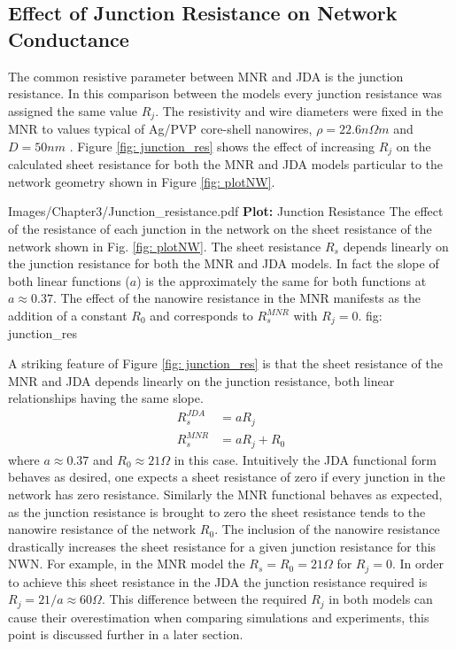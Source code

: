 \subsection{Effect of Junction Resistance on Network Conductance}
The common resistive parameter between MNR and JDA is the junction resistance. In this comparison between the models every junction resistance was assigned the same value $R_j$. The resistivity and wire diameters were fixed in the MNR to values typical of Ag/PVP core-shell nanowires, $\rho = 22.6 n \Omega m$ and $D = 50 nm$ \cite{rocha2015}. Figure \ref{fig: junction_res} shows the effect of increasing $R_j$ on the calculated sheet resistance for both the MNR and JDA models particular to the network geometry shown in Figure \ref{fig: plotNW}. 

{Images/Chapter3/Junction_resistance.pdf}
{\textbf{Plot:} Junction Resistance}
{The effect of the resistance of each junction in the network on the sheet resistance of the network shown in Fig. \ref{fig: plotNW}. The sheet resistance $R_s$ depends linearly on the junction resistance for both the MNR and JDA models. In fact the slope of both linear functions ($a$) is the approximately the same for both functions at $a \approx 0.37$. The effect of the nanowire resistance in the MNR manifests as the addition of a constant $R_0$ and corresponds to $R_s^{MNR}$ with $R_j = 0$.}
{fig: junction_res}

A striking feature of Figure \ref{fig: junction_res} is that the sheet resistance of the MNR and JDA depends linearly on the junction resistance, both linear relationships having the same slope.
\begin{align}
R_s^{JDA} &= a R_j  \label{eq: Rs_jda}\\
R_s^{MNR} &= a R_j + R_0 \label{eq: Rs_mnr}
\end{align}
where $a \approx 0.37$ and $R_0 \approx 21 \Omega$ in this case. Intuitively the JDA functional form behaves as desired, one expects a sheet resistance of zero if every junction in the network has zero resistance. Similarly the MNR functional behaves as expected, as the junction resistance is brought to zero the sheet resistance tends to the nanowire resistance of the network $R_0$. The inclusion of the nanowire resistance drastically increases the sheet resistance for a given junction resistance for this NWN. For example, in the MNR model the $R_s = R_0 = 21\Omega$ for $R_j = 0$. In order to achieve this sheet resistance in the JDA the junction resistance required is $R_j = 21/a \approx 60 \Omega$. This difference between the required $R_j$ in both models can cause their overestimation when comparing simulations and experiments, this point is discussed further in a later section.

